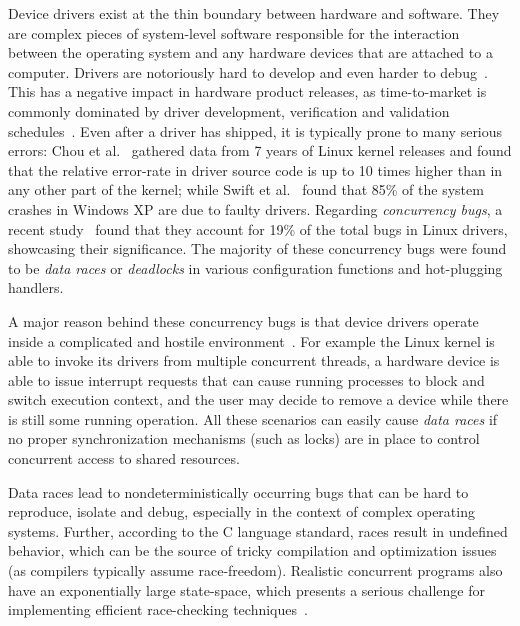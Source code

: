 Device drivers exist at the thin boundary between hardware and software. They are complex pieces of system-level software responsible for the interaction between the operating system and any hardware devices that are attached to a computer. Drivers are notoriously hard to develop and even harder to debug~\cite{corbet2005linux}. This has a negative impact in hardware product releases, as time-to-market is commonly dominated by driver development, verification and validation schedules~\cite{yavatkar2012era}.
%
Even after a driver has shipped, it is typically prone to many serious errors: Chou et al.~\cite{chou2001empirical} gathered data from 7 years of Linux kernel releases and found that the relative error-rate in driver source code is up to 10 times higher than in any other part of the kernel; while Swift et al.~\cite{Swift2003windowsxp} found that 85\% of the system crashes in Windows XP are due to faulty drivers. Regarding \emph{concurrency bugs}, a recent study~\cite{ryzhyk2009dingo} found that they account for 19\% of the total bugs in Linux drivers, showcasing their significance. The majority of these concurrency bugs were found to be \emph{data races} or \emph{deadlocks} in various configuration functions and hot-plugging handlers.

A major reason behind these concurrency bugs is that device drivers operate inside a complicated and hostile environment~\cite{corbet2005linux}. For example the Linux kernel is able to invoke its drivers from multiple concurrent threads, a hardware device is able to issue interrupt requests that can cause running processes to block and switch execution context, and the user may decide to remove a device while there is still some running operation. All these scenarios can easily cause \emph{data races} if no proper synchronization mechanisms (such as locks) are in place to control concurrent access to shared resources.

Data races lead to nondeterministically occurring bugs that can be hard to reproduce, isolate and debug, especially in the context of complex operating systems. Further, according to the C language standard, races result in undefined behavior, which can be the source of tricky compilation and optimization issues (as compilers typically assume race-freedom). Realistic concurrent programs also have an exponentially large state-space, which presents a serious challenge for implementing efficient race-checking techniques~\cite{musuvathi2008finding}.

